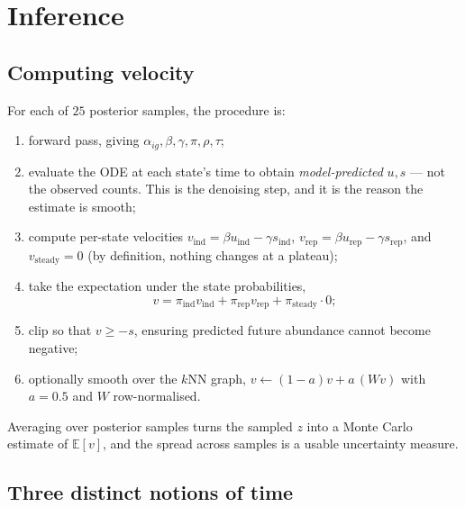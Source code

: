 \documentclass[11pt,a4paper]{article}
\newcommand{\uns}{u}
\newcommand{\spl}{s}
\newcommand{\E}{\mathbb{E}}
\theoremstyle{definition}
\begin{document}
\section{Inference}
\label{sec:inference}

\subsection{Computing velocity}

For each of $25$ posterior samples, the procedure is:

\begin{enumerate}[leftmargin=*]
\item forward pass, giving $\alpha_{ig}, \beta, \gamma, \pi, \rho, \tau$;
\item evaluate the ODE at each state's time to obtain \emph{model-predicted}
      $\uns, \spl$ --- not the observed counts. This is the denoising step, and
      it is the reason the estimate is smooth;
\item compute per-state velocities
      $v_{\text{ind}} = \beta \uns_{\text{ind}} - \gamma \spl_{\text{ind}}$,
      $v_{\text{rep}} = \beta \uns_{\text{rep}} - \gamma \spl_{\text{rep}}$, and
      $v_{\text{steady}} = 0$ (by definition, nothing changes at a plateau);
\item take the expectation under the state probabilities,
      \begin{equation}
      v = \pi_{\text{ind}} v_{\text{ind}} + \pi_{\text{rep}} v_{\text{rep}}
          + \pi_{\text{steady}} \cdot 0 ;
      \end{equation}
\item clip so that $v \ge -\spl$, ensuring predicted future abundance cannot
      become negative;
\item optionally smooth over the $k$NN graph,
      $v \leftarrow (1-a) v + a\,(Wv)$ with $a = 0.5$ and $W$ row-normalised.
\end{enumerate}

Averaging over posterior samples turns the sampled $z$ into a Monte Carlo
estimate of $\E[v]$, and the spread across samples is a usable uncertainty
measure.

\subsection{Three distinct notions of time}
\end{document}

